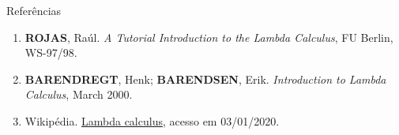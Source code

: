 \begin{frame}[fragile]{Referências}

    \begin{enumerate}
        \item \textbf{ROJAS}, Raúl. \textit{A Tutorial Introduction to the Lambda Calculus},
            FU Berlin, WS-97/98.
  
        \item \textbf{BARENDREGT}, Henk; \textbf{BARENDSEN}, Erik. \textit{Introduction to 
            Lambda Calculus}, March 2000.

        \item Wikipédia. \href{https://en.wikipedia.org/wiki/Lambda_calculus}{Lambda calculus},
            acesso em 03/01/2020. 

    \end{enumerate}

\end{frame}
